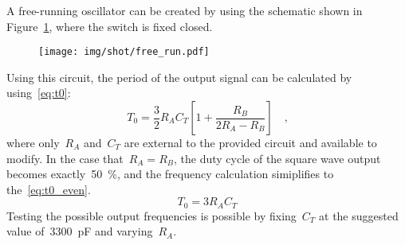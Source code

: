 A free-running oscillator can be created by using the schematic shown in
Figure~\ref{fig:free_run}, where the switch is fixed closed.
%
\begin{figure}[H]
	\centering
	\texttt{[image: img/shot/free\_run.pdf]}
	\caption{}
	\label{fig:free_run}
\end{figure}
%
Using this circuit, the period of the output signal can be calculated by using~\eqref{eq:t0}:
%
\begin{equation}
	T_0 = \frac{3}{2} R_A C_T \left[ 1 + \frac{R_B}{2R_A - R_B} \right] \quad \text{,}
	\label{eq:t0}
\end{equation}
%
where only~$R_A$ and~$C_T$ are external to the provided circuit and available
to modify.  In the case that~$R_A = R_B$, the duty cycle of the square wave
output becomes exactly~\SI{50}{\percent}, and the frequency calculation
simiplifies to the~\eqref{eq:t0_even}.
%
\begin{equation}
	T_0 = 3 R_A C_T
	\label{eq:t0_even}
\end{equation}
%
Testing the possible output frequencies is possible by fixing~$C_T$ at the suggested value of~\SI{3300}{\pico\farad} and varying~$R_A$.
